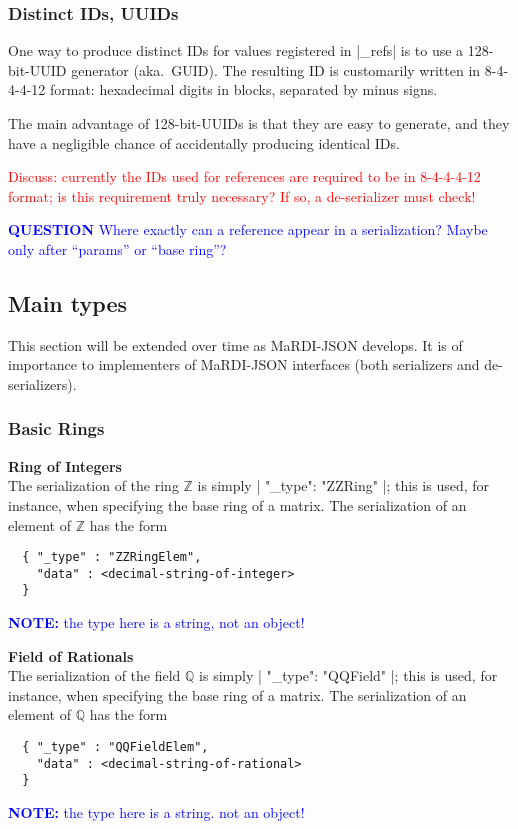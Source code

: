 \documentclass{article}
\newcommand{\blueverb}{\collectverb{\color{blue}\colorbox{gray!20}}}
\newcommand{\MaRDIJSON}{MaRDI-JSON}
\newcommand \QQ {{\mathbb Q}}
\newcommand \ZZ {{\mathbb Z}}
\def\red#1{\textcolor{red}{#1}}
\def\blue#1{\textcolor{blue}{#1}}
\begin{document}
\subsubsection{Distinct IDs, UUIDs}
\label{sec:UUID}

One way to produce distinct IDs for values registered in \blueverb|_refs| is to
use a 128-bit-UUID generator (aka.~GUID).  The resulting ID is customarily written in
8-4-4-4-12 format: hexadecimal digits in blocks, separated by minus signs.

The main advantage of 128-bit-UUIDs is that they are easy to generate, and they
have a negligible chance of accidentally producing identical IDs.

\red{Discuss: currently the IDs used for references are required to be in 8-4-4-4-12 format; is this requirement truly necessary?  If so, a de-serializer must check!}

\blue{\textbf{QUESTION} Where exactly can a reference appear in a serialization?  Maybe only after ``params'' or ``base ring''?}


\subsection{Main types}
\label{sec:MainTypes}

This section will be extended over time as {\MaRDIJSON} develops.  It is of
importance to implementers of {\MaRDIJSON} interfaces (both serializers and de-serializers).

\subsubsection{Basic Rings}
\label{sec:BasicRings}

\textbf{Ring of Integers}\\
The serialization of the ring $\ZZ$ is simply \blueverb|{ "_type": "ZZRing" }|; this is used, for instance, when specifying the base ring of a matrix.
The serialization of an element of $\ZZ$ has the form
\begin{verbatim}
  { "_type" : "ZZRingElem",
    "data" : <decimal-string-of-integer>
  }
\end{verbatim}
\blue{\textbf{NOTE:} the type here is a string, not an object!}

\goodbreak
\textbf{Field of Rationals}\\
The serialization of the field $\QQ$ is simply \blueverb|{ "_type": "QQField" }|; this is used, for instance, when specifying the base ring of a matrix.
The serialization of an element of $\QQ$ has the form
\begin{verbatim}
  { "_type" : "QQFieldElem",
    "data" : <decimal-string-of-rational>
  }
\end{verbatim}
\blue{\textbf{NOTE:} the type here is a string. not an object!}
\end{document}
